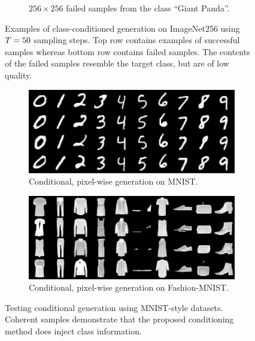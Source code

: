 \begin{figure}[ht]
\begin{subfigure}[b]{0.47\textwidth}
        \caption{
            $256 \times 256$ failed samples from the class ``Giant Panda''.
        }
    \end{subfigure}
    \caption{
        Examples of class-conditioned generation on ImageNet256 using
        $T = 50$ sampling steps. Top row contains examples of
        successful samples whereas bottom row contains failed samples. The
        contents of the failed samples resemble the target class, but are of low
        quality.
    }
    \label{fig:imagenet}
\end{figure}

\begin{figure}[ht]
    \centering
    \begin{subfigure}[b]{0.47\textwidth}
        \centering
        \includegraphics[width=1.0\textwidth]{figures/mnist-samples.png}
        \caption{
            Conditional, pixel-wise generation on MNIST.
        }
    \end{subfigure}
    \hfill
    \begin{subfigure}[b]{0.47\textwidth}
        \centering
        \includegraphics[width=1.0\textwidth]{figures/fashionmnist-samples.png}
        \caption{
            Conditional, pixel-wise generation on Fashion-MNIST.
        }
    \end{subfigure}
    \caption{
        Testing conditional generation using MNIST-style datasets. Coherent
        samples demonstrate that the proposed conditioning method does inject class
        information.
    }
    \label{fig:mnist}
\end{figure}

